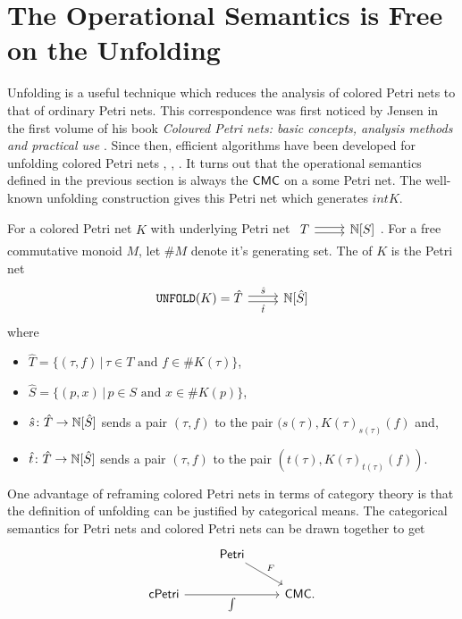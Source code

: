 \section{The Operational Semantics is Free on the Unfolding}Unfolding is a useful technique which reduces the analysis of colored Petri nets to that of ordinary Petri nets. This correspondence was first noticed by Jensen in the first volume of his book \emph{Coloured Petri nets: basic concepts, analysis methods and practical use} \cite{jensen2013coloured}. Since then, efficient algorithms have been developed for unfolding colored Petri nets \cite{systemsbio}, \cite{liu2012efficient}, \cite{kordon2006optimized}. It turns out that the operational semantics defined in the previous section is always the $\mathsf{CMC}$ on a some Petri net. The well-known unfolding construction gives this Petri net which generates $
int K$.
\begin{defn}\label{unfold}
For a colored Petri net $K$ with underlying Petri net $\begin{tikzcd}T \ar[r,shift left=.5ex] \ar[r,shift right=.5ex] & \N[S] \end{tikzcd}$. For a free commutative monoid $M$, let $\#M$ denote it's generating set. The  of $K$ is the Petri net
\[
\begin{tikzcd} 
\UNFOLD(K) = \hat{T} \ar[r,shift left=.5ex,"\hat{s}"] \ar[r, shift right=.5ex,"\hat{t}",swap] & \N[\hat{S}]
\end{tikzcd}\]
where 
\begin{itemize}
    \item $\hat{T} = \{ (\tau, f) \, | \, \tau \in T \text{ and }f \in \# K(\tau)\}$,
    \item $\hat{S} = \{ (p, x) \,|\, p \in S \text{ and } x \in \# K(p)  \}$,
    \item $\hat{s} \colon \hat{T} \to \mathbb{N}[\hat{S}]$ sends a pair $(\tau,f)$ to the pair $(s(\tau), K(\tau)_{s(\tau)} (f)$ and,
    \item $\hat{t} \colon \hat{T} \to \mathbb{N}[\hat{S}]$ sends a pair $(\tau, f)$ to the pair $(t(\tau),K(\tau)_{t(\tau)} (f) )$.
\end{itemize}
\end{defn}
One advantage of reframing colored Petri nets in terms of category theory is that the definition of unfolding can be justified by categorical means.
The categorical semantics for Petri nets and colored Petri nets can be drawn together to get
\[
\begin{tikzcd} 
& \Petri \ar[dr,"F"] & \\
\cPetri \ar[rr,"\int",swap]  & &\CMC.
\end{tikzcd}
\]

